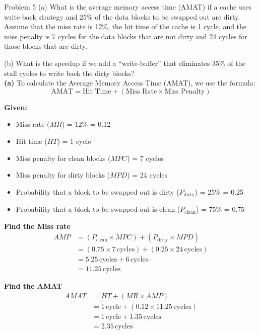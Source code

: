 \begin{problem}{}{Problem 5}
	(a) What is the average memory access time (AMAT) if a cache uses write-back strategy and 25\% of the data blocks to be swapped out are dirty. Assume that the miss rate is 12\%, the hit time of the cache is 1 cycle, and the miss penalty is 7 cycles for the data blocks that are not dirty and 24 cycles for those blocks that are dirty.
	
	(b) What is the speedup if we add a “write-buffer” that eliminates 35\% of the stall cycles to write back the dirty blocks?\\
	\textbf{(a)} To calculate the Average Memory Access Time (AMAT), we use the formula:
	\[
	\text{AMAT} = \text{Hit Time} + (\text{Miss Rate} \times \text{Miss Penalty})
	\]
	
	\textbf{Given:}
	\begin{itemize}
		\item Miss rate (\( MR \)) = 12\% = 0.12
		\item Hit time (\( HT \)) = 1 cycle
		\item Miss penalty for clean blocks (\( MPC \)) = 7 cycles
		\item Miss penalty for dirty blocks (\( MPD \)) = 24 cycles
		\item Probability that a block to be swapped out is dirty (\( P_{\text{dirty}} \)) = 25\% = 0.25
		\item Probability that a block to be swapped out is clean (\( P_{\text{clean}} \)) = 75\% = 0.75
	\end{itemize}
	
	\textbf{Find the Miss rate}
	\begin{align*}
		AMP &= (P_{\text{clean}} \times MPC) + (P_{\text{dirty}} \times MPD) \\
		&= (0.75 \times 7\, \text{cycles}) + (0.25 \times 24\, \text{cycles}) \\
		&= 5.25\, \text{cycles} + 6\, \text{cycles} \\
		&= 11.25\, \text{cycles}
	\end{align*}
	
	\textbf{Find the AMAT}
	\begin{align*}
		AMAT &= HT + (MR \times AMP) \\
		&= 1\, \text{cycle} + (0.12 \times 11.25\, \text{cycles}) \\
		&= 1\, \text{cycle} + 1.35\, \text{cycles} \\
		&= 2.35\, \text{cycles}
	\end{align*}
	

\end{problem}
